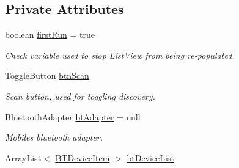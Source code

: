 \subsection*{Private Attributes}
\begin{DoxyCompactItemize}
\item 
\mbox{\label{classcom_1_1jack_1_1motorbikestatistics_1_1_pair_device_fragment_a11d29b376fa4676ab5852bba1369c0d0}} 
boolean \hyperlink{classcom_1_1jack_1_1motorbikestatistics_1_1_pair_device_fragment_a11d29b376fa4676ab5852bba1369c0d0}{first\+Run} = true
\begin{DoxyCompactList}\small\item\em Check variable used to stop List\+View from being re-\/populated. \end{DoxyCompactList}\item 
\mbox{\label{classcom_1_1jack_1_1motorbikestatistics_1_1_pair_device_fragment_a1bf1c9b623a1b9891e0d574006cf8d5f}} 
Toggle\+Button \hyperlink{classcom_1_1jack_1_1motorbikestatistics_1_1_pair_device_fragment_a1bf1c9b623a1b9891e0d574006cf8d5f}{btn\+Scan}
\begin{DoxyCompactList}\small\item\em Scan button, used for toggling discovery. \end{DoxyCompactList}\item 
\mbox{\label{classcom_1_1jack_1_1motorbikestatistics_1_1_pair_device_fragment_ac21b65a91245ae03ebba675e41166ace}} 
Bluetooth\+Adapter \hyperlink{classcom_1_1jack_1_1motorbikestatistics_1_1_pair_device_fragment_ac21b65a91245ae03ebba675e41166ace}{bt\+Adapter} = null
\begin{DoxyCompactList}\small\item\em Mobile\textquotesingle{}s bluetooth adapter. \end{DoxyCompactList}\item 
\mbox{\label{classcom_1_1jack_1_1motorbikestatistics_1_1_pair_device_fragment_a422043a997fbe99ca9391440ce8b1180}} 
Array\+List$<$ \hyperlink{classcom_1_1jack_1_1motorbikestatistics_1_1_b_t_device_item}{B\+T\+Device\+Item} $>$ \hyperlink{classcom_1_1jack_1_1motorbikestatistics_1_1_pair_device_fragment_a422043a997fbe99ca9391440ce8b1180}{bt\+Device\+List}

\end{DoxyCompactItemize}
